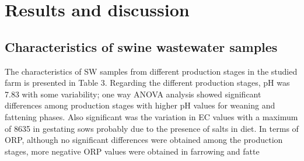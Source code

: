 \section{Results and discussion}
\subsection{Characteristics of swine wastewater samples}
The characteristics of SW samples from different production stages in the studied farm is presented in Table 3. Regarding the different production stages, pH was 7.83 with some variability; one way ANOVA analysis showed significant differences among production stages with higher pH values for weaning and fattening phases. Also significant was the variation in EC values with a maximum of 8635  in gestating sows probably due to the presence of salts in diet. In terms of ORP, although no significant differences were obtained among the production stages, more negative ORP values were obtained in farrowing and fatte